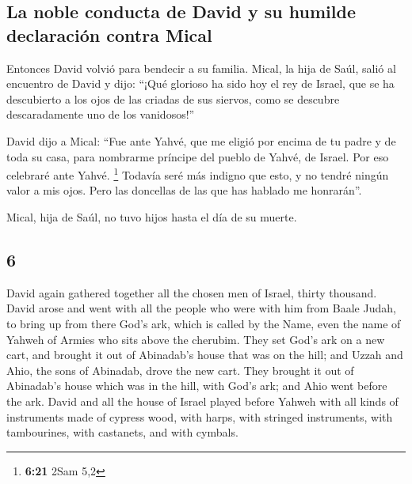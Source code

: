 \begin{paracol}{2}
\hypertarget{la-noble-conducta-de-david-y-su-humilde-declaraciuxf3n-contra-mical}{%
\subsection{La noble conducta de David y su humilde declaración contra
Mical}\label{la-noble-conducta-de-david-y-su-humilde-declaraciuxf3n-contra-mical}}

 Entonces David volvió para bendecir a su familia. Mical,
la hija de Saúl, salió al encuentro de David y dijo: ``¡Qué glorioso ha
sido hoy el rey de Israel, que se ha descubierto a los ojos de las
criadas de sus siervos, como se descubre descaradamente uno de los
vanidosos!''

 David dijo a Mical: ``Fue ante Yahvé, que me eligió por
encima de tu padre y de toda su casa, para nombrarme príncipe del pueblo
de Yahvé, de Israel. Por eso celebraré ante Yahvé. \footnote{\textbf{6:21}
  2Sam 5,2}  Todavía seré más indigno que esto, y no
tendré ningún valor a mis ojos. Pero las doncellas de las que has
hablado me honrarán''.

 Mical, hija de Saúl, no tuvo hijos hasta el día de su
muerte.

\switchcolumn
\begin{otherlanguage}{english}

\hypertarget{section-11}{%
\section{6}\label{section-11}}

 David again gathered together all the chosen men of
Israel, thirty thousand.  David arose and went with all
the people who were with him from Baale Judah, to bring up from there
God's ark, which is called by the Name, even the name of Yahweh of
Armies who sits above the cherubim.  They set God's ark on
a new cart, and brought it out of Abinadab's house that was on the hill;
and Uzzah and Ahio, the sons of Abinadab, drove the new cart.
 They brought it out of Abinadab's house which was in the
hill, with God's ark; and Ahio went before the ark.  David
and all the house of Israel played before Yahweh with all kinds of
instruments made of cypress wood, with harps, with stringed instruments,
with tambourines, with castanets, and with cymbals.


\end{otherlanguage}
\end{paracol}
